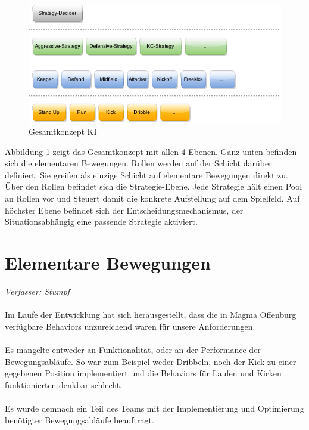 \documentclass[fontsize=12pt,a4paper,final]{scrartcl}[2003/01/01]
\makeatletter
\def\ScaleIfNeeded{%
	\ifdim\Gin@nat@width>\linewidth
		\linewidth
	\else
		\Gin@nat@width
	\fi
}
\makeatother
\begin{document}
\begin{figure}[H]
	\centering
	\includegraphics[width=\ScaleIfNeeded]{Grafiken/KI/Ki-Concept}
	\caption{Gesamtkonzept KI}
	\label{Gesamtkonzept KI}
\end{figure}

Abbildung \ref{Gesamtkonzept KI} zeigt das Gesamtkonzept mit allen 4 Ebenen. Ganz unten befinden sich die elementaren Bewegungen. Rollen werden auf der Schicht darüber definiert. Sie greifen als einzige Schicht auf elementare Bewegungen direkt zu. Über den Rollen befindet sich die Strategie-Ebene. Jede Strategie hält einen Pool an Rollen vor und Steuert damit die konkrete Aufstellung auf dem Spielfeld. Auf höchster Ebene befindet sich der Entscheidungsmechanismus, der Situationsabhängig eine passende Strategie aktiviert. 


\section{Elementare Bewegungen}\label{se:Elementare Bewegungen}
\textit{Verfasser: Stumpf}\\
\\
Im Laufe der Entwicklung hat sich herausgestellt, dass die in Magma Offenburg verfügbare Behaviors unzureichend waren für unsere Anforderungen.\\
\\
Es mangelte entweder an Funktionalität, oder an der Performance der Bewegungsabläufe. So war zum Beispiel weder Dribbeln, noch der Kick zu einer gegebenen Position implementiert und die Behaviors für Laufen und Kicken funktionierten denkbar schlecht.\\
\\
Es wurde demnach ein Teil des Teams mit der Implementierung und Optimierung benötigter Bewegungsabläufe beauftragt.
\end{document}
